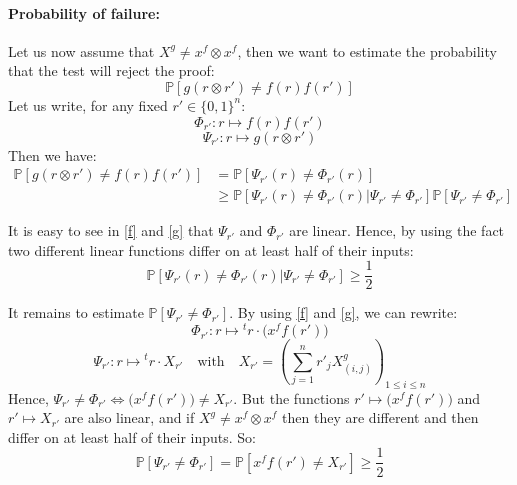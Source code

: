 \documentclass[a4paper,10pt]{article}
\newcommand{\prob}[1]{\mathbb{P}\left[#1\right]}
\theoremstyle{remark}
\begin{document}
\paragraph{Probability of failure:} Let us now assume that $X^g\neq x^f\otimes
x^f$, then we want to estimate the probability that the test will reject the
proof:
\begin{displaymath}
\prob{g(r\otimes r')\neq f(r)f(r')}
\end{displaymath}
Let us write, for any fixed $r'\in\{0,1\}^n$:
\begin{displaymath}
\Phi _{r'}:r\mapsto f(r)f(r') 
\end{displaymath}
\begin{displaymath}
\Psi _{r'}:r\mapsto g(r \otimes r')
\end{displaymath}
Then we have:
\begin{equation}\label{main}
\begin{split}
\prob{g(r\otimes r')\neq f(r)f(r')}
&= \prob{\Psi_{r'}(r)\neq\Phi_{r'}(r)}\\
&\geq \prob{\Psi_{r'}(r)\neq\Phi_{r'}(r)|\Psi_{r'}\neq\Phi_{r'}}
\prob{\Psi_{r'}\neq\Phi_{r'}}
\end{split}
\end{equation}

It is easy to see in \eqref{f} and \eqref{g} that $\Psi_{r'}$ and $\Phi_{r'}$
are linear. Hence, by using the fact two different linear functions differ on
at least half of their inputs:
\begin{equation}\label{first}
\prob{\Psi_{r'}(r)\neq\Phi_{r'}(r)|\Psi_{r'}\neq\Phi_{r'}} \geq \frac{1}{2}
\end{equation}

It remains to estimate $\prob{\Psi_{r'}\neq\Phi_{r'}}$. By using \eqref{f} and
\eqref{g}, we can rewrite:
\begin{displaymath}
\Phi_{r'}:r\mapsto{}^tr\cdot \big(x^ff(r')\big)
\end{displaymath}
\begin{displaymath}
\Psi_{r'}:r\mapsto{}^tr\cdot X_{r'}\quad\mathrm{with}\quad
X_{r'} = \left(\sum_{j=1}^n r'_jX^g_{(i,j)}\right)_{1\leq i\leq n}
\end{displaymath}
Hence, $\Psi_{r'}\neq\Phi_{r'}\Leftrightarrow\big(x^ff(r')\big)\neq X_{r'}$.
But the functions $r'\mapsto\big(x^ff(r')\big)$ and $r'\mapsto X_{r'}$ are also
linear, and if $X^g\neq x^f\otimes x^f$ then they are different and then differ
on at least half of their inputs. So:
\begin{equation}\label{second}
\prob{\Psi_{r'}\neq\Phi_{r'}}
=\prob{x^ff(r')\neq X_{r'}}
\geq\frac{1}{2}
\end{equation}
\end{document}
